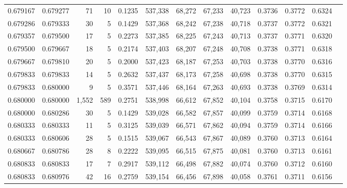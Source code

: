 \begin{tabular}{rrrrrrrrrrrrr}
0.679167 & 0.679277 &    71 &  10 &                                     0.1235 & 537,338 &  68,272 &  67,233 &  40,723 & 0.3736 & 0.3772 & 0.6324 \\
0.679286 & 0.679333 &    30 &   5 &                                     0.1429 & 537,368 &  68,242 &  67,238 &  40,718 & 0.3737 & 0.3772 & 0.6321 \\
0.679357 & 0.679500 &    17 &   5 &                                     0.2273 & 537,385 &  68,225 &  67,243 &  40,713 & 0.3737 & 0.3771 & 0.6320 \\
0.679500 & 0.679667 &    18 &   5 &                                     0.2174 & 537,403 &  68,207 &  67,248 &  40,708 & 0.3738 & 0.3771 & 0.6318 \\
0.679667 & 0.679810 &    20 &   5 &                                     0.2000 & 537,423 &  68,187 &  67,253 &  40,703 & 0.3738 & 0.3770 & 0.6316 \\
0.679833 & 0.679833 &    14 &   5 &                                     0.2632 & 537,437 &  68,173 &  67,258 &  40,698 & 0.3738 & 0.3770 & 0.6315 \\
0.679833 & 0.680000 &     9 &   5 &                                     0.3571 & 537,446 &  68,164 &  67,263 &  40,693 & 0.3738 & 0.3769 & 0.6314 \\
0.680000 & 0.680000 & 1,552 & 589 &                                     0.2751 & 538,998 &  66,612 &  67,852 &  40,104 & 0.3758 & 0.3715 & 0.6170 \\
0.680000 & 0.680286 &    30 &   5 &                                     0.1429 & 539,028 &  66,582 &  67,857 &  40,099 & 0.3759 & 0.3714 & 0.6168 \\
0.680333 & 0.680333 &    11 &   5 &                                     0.3125 & 539,039 &  66,571 &  67,862 &  40,094 & 0.3759 & 0.3714 & 0.6166 \\
0.680333 & 0.680606 &    28 &   5 &                                     0.1515 & 539,067 &  66,543 &  67,867 &  40,089 & 0.3760 & 0.3713 & 0.6164 \\
0.680667 & 0.680786 &    28 &   8 &                                     0.2222 & 539,095 &  66,515 &  67,875 &  40,081 & 0.3760 & 0.3713 & 0.6161 \\
0.680833 & 0.680833 &    17 &   7 &                                     0.2917 & 539,112 &  66,498 &  67,882 &  40,074 & 0.3760 & 0.3712 & 0.6160 \\
0.680833 & 0.680976 &    42 &  16 &                                     0.2759 & 539,154 &  66,456 &  67,898 &  40,058 & 0.3761 & 0.3711 & 0.6156 \\

\end{tabular}
